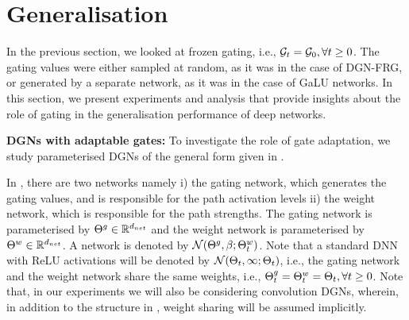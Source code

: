 \section{Generalisation}\label{sec:generalisation}
In the previous section, we looked at frozen gating, i.e., $\mathcal{G}_t=\mathcal{G}_0,\forall t\geq 0$. The gating values were either sampled at random, as it was in the case of DGN-FRG, or generated by a separate network, as it was in the case of GaLU networks. In this section, we present experiments and analysis that provide insights about the role of gating in the generalisation performance of deep networks.


\textbf{DGNs with adaptable gates:} To investigate the role of gate adaptation,  we study parameterised DGNs of the general form given in . %
\FloatBarrier
\begin{table}[h]
\caption{A DGN with parameterised gates. Here, for $\epsilon\geq 0$ is a hyper-parameter, and $\chi_{\epsilon}(v)=\frac{1+\epsilon}{1+\exp(v)}, \forall v\in \R$.}
\label{tb:dgn-parameterised}
\end{table}
In , there are two networks namely i) the gating network, which generates the gating values, and is responsible for the path activation levels ii) the weight network, which is responsible for the path strengths. The gating network is parameterised by ${\Theta}^g\in \mathbb{R}^{d_{net}}$ and the weight network is parameterised by ${\Theta}^w\in \mathbb{R}^{d_{net}}$. A network is denoted by $\mathcal{N}({\Theta}^g,\beta;{\Theta}^w_t)$. Note that a standard DNN with ReLU activations will be denoted by $\mathcal{N}(\Theta_t,\infty;\Theta_t)$, i.e., the gating network and the weight network share the same weights, i.e., ${\Theta}^g_t={\Theta}^w_t=\Theta_t,\forall t\geq 0$. Note that, in our experiments we will also be considering convolution DGNs, wherein, in addition to the structure in , weight sharing will be assumed implicitly.

